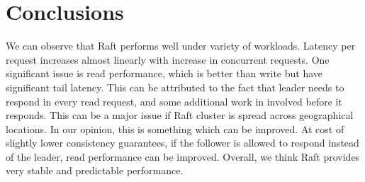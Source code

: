 \section{Conclusions}

We can observe that Raft performs well under variety of workloads. Latency per request increases almost linearly with increase in concurrent requests. One significant issue is read performance, which is better than write but have significant tail latency. This can be attributed to the fact that leader needs to respond in every read request, and some additional work in involved before it responds. This can be a major issue if Raft cluster is spread across geographical locations. In our opinion, this is something which can be improved. At cost of slightly lower consistency guarantees, if the follower is allowed to respond instead of the leader, read performance can be improved. Overall, we think Raft provides very stable and predictable performance. 